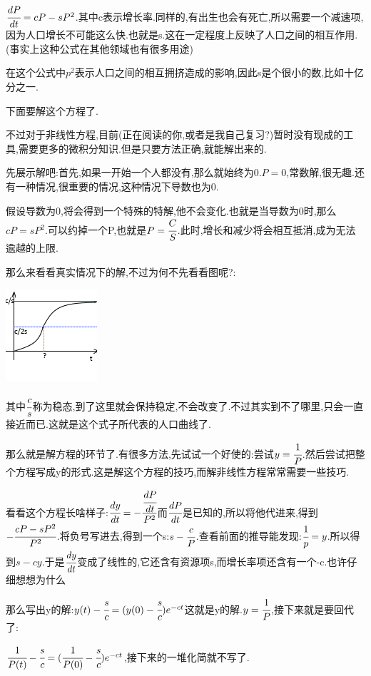 {{{  $\cfrac{dP}{dt} = cP - sP^2$.其中c表示增长率.同样的,有出生也会有死亡,所以需要一个减速项,因为人口增长不可能这么快.也就是s.这在一定程度上反映了人口之间的相互作用.(事实上这种公式在其他领域也有很多用途)

  在这个公式中$p^2$表示人口之间的相互拥挤造成的影响,因此s是个很小的数,比如十亿分之一.

  下面要解这个方程了.

  不过对于非线性方程,目前(正在阅读的你,或者是我自己复习?)暂时没有现成的工具,需要更多的微积分知识.但是只要方法正确,就能解出来的.

  先展示解吧:首先,如果一开始一个人都没有,那么就始终为0.$P = 0$,常数解,很无趣.还有一种情况,很重要的情况,这种情况下导数也为0.

  假设导数为0,将会得到一个特殊的特解,他不会变化.也就是当导数为0时,那么$cP = sP^2$.可以约掉一个P,也就是$P = \cfrac{C}{S}$.此时,增长和减少将会相互抵消,成为无法逾越的上限.

  那么来看看真实情况下的解,不过为何不先看看图呢?:

  \begin{center}
    \includegraphics{resources/nonLinearDifferencialEquation_HumanGrow.png}
  \end{center}

  其中$\cfrac{c}{s}$称为稳态,到了这里就会保持稳定,不会改变了.不过其实到不了哪里,只会一直接近而已.这就是这个式子所代表的人口曲线了.

  那么就是解方程的环节了.有很多方法,先试试一个好使的:尝试$y = \cfrac{1}{P}$.然后尝试把整个方程写成y的形式.这是解这个方程的技巧,而解非线性方程常常需要一些技巧.

  看看这个方程长啥样子:$\cfrac{dy}{dt} = -\cfrac{\cfrac{dP}{dt}}{P^2}$而$\cfrac{dP}{dt}$是已知的,所以将他代进来,得到$-\cfrac{cP - sP^2}{P^2}$.将负号写进去,得到一个s:$s - \cfrac{c}{P}$.查看前面的推导能发现:$\cfrac{1}{p} = y$.所以得到$s - cy$.于是$\cfrac{dy}{dt}$变成了线性的,它还含有资源项s,而增长率项还含有一个-c.也许仔细想想为什么

  那么写出y的解:$y(t) - \cfrac{s}{c} = (y(0) - \cfrac{s}{c})e^{-ct}$这就是y的解.$y = \cfrac{1}{P}$,接下来就是要回代了:

  $\cfrac{1}{P(t)} - \cfrac{s}{c} = (\cfrac{1}{P(0)} - \cfrac{s}{c})e^{-ct}$,接下来的一堆化简就不写了.

}}}
